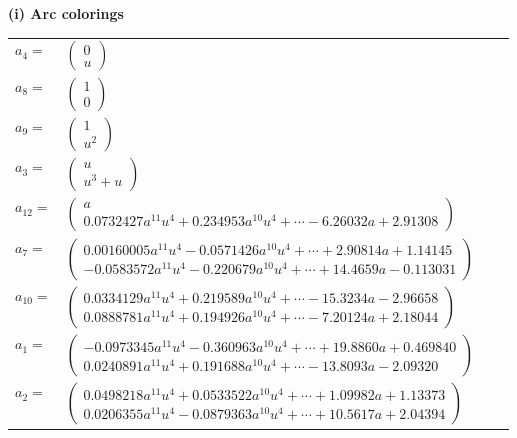 \documentclass[1p]{elsarticle_modified}
\theoremstyle{definition}
\begin{document}
\flushleft \textbf{(i) Arc colorings}\\
\begin{tabular}{m{7pt} m{180pt} m{7pt} m{180pt} }
\flushright $a_{4}=$&$\begin{pmatrix}0\\u\end{pmatrix}$ \\
\flushright $a_{8}=$&$\begin{pmatrix}1\\0\end{pmatrix}$ \\
\flushright $a_{9}=$&$\begin{pmatrix}1\\u^2\end{pmatrix}$ \\
\flushright $a_{3}=$&$\begin{pmatrix}u\\u^3+u\end{pmatrix}$ \\
\flushright $a_{12}=$&$\begin{pmatrix}a\\0.0732427 a^{11} u^{4}+0.234953 a^{10} u^{4}+\cdots-6.26032 a+2.91308\end{pmatrix}$ \\
\flushright $a_{7}=$&$\begin{pmatrix}0.00160005 a^{11} u^{4}-0.0571426 a^{10} u^{4}+\cdots+2.90814 a+1.14145\\-0.0583572 a^{11} u^{4}-0.220679 a^{10} u^{4}+\cdots+14.4659 a-0.113031\end{pmatrix}$ \\
\flushright $a_{10}=$&$\begin{pmatrix}0.0334129 a^{11} u^{4}+0.219589 a^{10} u^{4}+\cdots-15.3234 a-2.96658\\0.0888781 a^{11} u^{4}+0.194926 a^{10} u^{4}+\cdots-7.20124 a+2.18044\end{pmatrix}$ \\
\flushright $a_{1}=$&$\begin{pmatrix}-0.0973345 a^{11} u^{4}-0.360963 a^{10} u^{4}+\cdots+19.8860 a+0.469840\\0.0240891 a^{11} u^{4}+0.191688 a^{10} u^{4}+\cdots-13.8093 a-2.09320\end{pmatrix}$ \\
\flushright $a_{2}=$&$\begin{pmatrix}0.0498218 a^{11} u^{4}+0.0533522 a^{10} u^{4}+\cdots+1.09982 a+1.13373\\0.0206355 a^{11} u^{4}-0.0879363 a^{10} u^{4}+\cdots+10.5617 a+2.04394\end{pmatrix}$ \\

\end{tabular}
\end{document}

